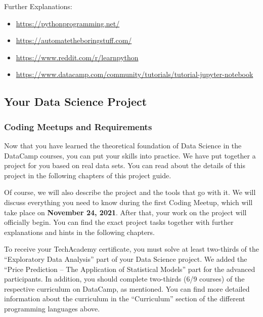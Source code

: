 \documentclass[
  11pt,
]{article}
\providecommand{\tightlist}{%
  \setlength{\itemsep}{0pt}\setlength{\parskip}{0pt}}
\begin{document}
Further Explanations:

\begin{itemize}
\tightlist
\item
  \url{https://pythonprogramming.net/}
\item
  \url{https://automatetheboringstuff.com/}
\item
  \url{https://www.reddit.com/r/learnpython}
\item
  \url{https://www.datacamp.com/community/tutorials/tutorial-jupyter-notebook}
\end{itemize}

\hypertarget{your-data-science-project}{%
\subsection{Your Data Science Project}\label{your-data-science-project}}

\hypertarget{coding-meetups-and-requirements}{%
\subsubsection{Coding Meetups and Requirements}\label{coding-meetups-and-requirements}}

Now that you have learned the theoretical foundation of Data Science in the DataCamp courses, you can put your skills into practice.
We have put together a project for you based on real data sets.
You can read about the details of this project in the following chapters of this project guide.

Of course, we will also describe the project and the tools that go with it.
We will discuss everything you need to know during the first Coding Meetup, which will take place on \textbf{November 24, 2021}.
After that, your work on the project will officially begin.
You can find the exact project tasks together with further explanations and hints in the following chapters.

To receive your TechAcademy certificate, you must solve at least two-thirds of the ``Exploratory Data Analysis'' part of your Data Science project.
We added the ``Price Prediction -- The Application of Statistical Models'' part for the advanced participants.
In addition, you should complete two-thirds (6/9 courses) of the respective curriculum on DataCamp, as mentioned.
You can find more detailed information about the curriculum in the ``Curriculum'' section of the different programming languages above.

\newpage
\end{document}
